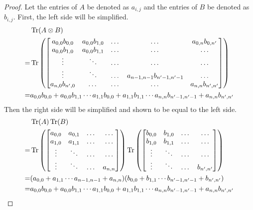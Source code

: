 \begin{proof}
Let the entries of $A$ be denoted as $a_{i,j}$ and the entries of $B$ be denoted as $b_{i,j}$. First, the left side will be simplified.
\begin{align}
&\operatorname{Tr}(A \otimes B)\\
=&\operatorname{Tr}\left(\begin{bmatrix} 
    a_{0,0}b_{0,0} & a_{0,0}b_{1,0} & \dots & \dots & a_{0,n}b_{0,n'}\\
    a_{0,0}b_{1,0} & a_{0,0}b_{1,1} & \dots & \dots & \dots\\
    \vdots & \ddots & \dots & \dots & \dots\\
    \vdots & \ddots & \dots & a_{n-1,n-1}b_{n'-1,n'-1} & \dots\\
    a_{n,0}b_{n',0} & \dots & \dots & \dots & a_{n,n}b_{n',n'} 
\end{bmatrix}\right)\\
=&a_{0,0}b_{0,0} + a_{0,0}b_{1,1} \cdots a_{1,1}b_{0,0} + a_{1,1}b_{1,1} \cdots a_{n,n}b_{n'-1,n'-1} + a_{n,n}b_{n',n'}
\end{align}
Then the right side will be simplified and shown to be equal to the left side.
\begin{align}
&\operatorname{Tr}(A)\operatorname{Tr}(B)\\
=&\operatorname{Tr}\left(\begin{bmatrix} 
    a_{0,0} & a_{0,1} & \dots & \dots\\
    a_{1,0} & a_{1,1} & \dots & \dots\\
    \vdots & \ddots & \dots & \dots\\
    \vdots & \ddots & \dots & a_{n,n}
\end{bmatrix}\right)\operatorname{Tr}\left(\begin{bmatrix} 
    b_{0,0} & b_{1,0} & \dots & \dots\\
    b_{1,0} & b_{1,1} & \dots & \dots\\
    \vdots & \ddots & \dots & \dots\\
    \vdots & \ddots & \dots & b_{n',n'}
\end{bmatrix}\right)\\
=&(a_{0,0} + a_{1,1} \cdots a_{n-1,n-1} + a_{n,n})(b_{0,0} + b_{1,1} \cdots b_{n'-1,n'-1} + b_{n',n'})\\
=&a_{0,0}b_{0,0} + a_{0,0}b_{1,1} \cdots a_{1,1}b_{0,0} + a_{1,1}b_{1,1} \cdots a_{n,n}b_{n'-1,n'-1} + a_{n,n}b_{n',n'}
\end{align}
\end{proof}


